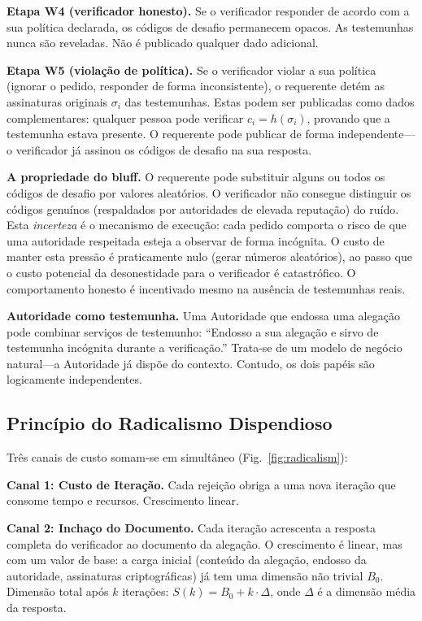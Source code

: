 \documentclass[11pt,a4paper,twocolumn]{article}
\begin{document}
\textbf{Etapa W4 (verificador honesto).} Se o verificador responder de acordo com a sua política declarada, os códigos de desafio permanecem opacos. As testemunhas nunca são reveladas. Não é publicado qualquer dado adicional.

\textbf{Etapa W5 (violação de política).} Se o verificador violar a sua política (ignorar o pedido, responder de forma inconsistente), o requerente detém as assinaturas originais $\sigma_i$ das testemunhas. Estas podem ser publicadas como dados complementares: qualquer pessoa pode verificar $c_i = h(\sigma_i)$, provando que a testemunha estava presente. O requerente pode publicar de forma independente---o verificador já assinou os códigos de desafio na sua resposta.

\textbf{A propriedade do bluff.} O requerente pode substituir alguns ou todos os códigos de desafio por valores aleatórios. O verificador não consegue distinguir os códigos genuínos (respaldados por autoridades de elevada reputação) do ruído. Esta \emph{incerteza} é o mecanismo de execução: cada pedido comporta o risco de que uma autoridade respeitada esteja a observar de forma incógnita. O custo de manter esta pressão é praticamente nulo (gerar números aleatórios), ao passo que o custo potencial da desonestidade para o verificador é catastrófico. O comportamento honesto é incentivado mesmo na ausência de testemunhas reais.

\textbf{Autoridade como testemunha.} Uma Autoridade que endossa uma alegação pode combinar serviços de testemunho: ``Endosso a sua alegação e sirvo de testemunha incógnita durante a verificação.'' Trata-se de um modelo de negócio natural---a Autoridade já dispõe do contexto. Contudo, os dois papéis são logicamente independentes.

\subsection{Princípio do Radicalismo Dispendioso}

Três canais de custo somam-se em simultâneo (Fig.~\ref{fig:radicalism}):

\textbf{Canal 1: Custo de Iteração.} Cada rejeição obriga a uma nova iteração que consome tempo e recursos. Crescimento linear.

\textbf{Canal 2: Inchaço do Documento.} Cada iteração acrescenta a resposta completa do verificador ao documento da alegação. O crescimento é linear, mas com um valor de base: a carga inicial (conteúdo da alegação, endosso da autoridade, assinaturas criptográficas) já tem uma dimensão não trivial $B_0$. Dimensão total após $k$ iterações: $S(k) = B_0 + k \cdot \Delta$, onde $\Delta$ é a dimensão média da resposta.
\end{document}
